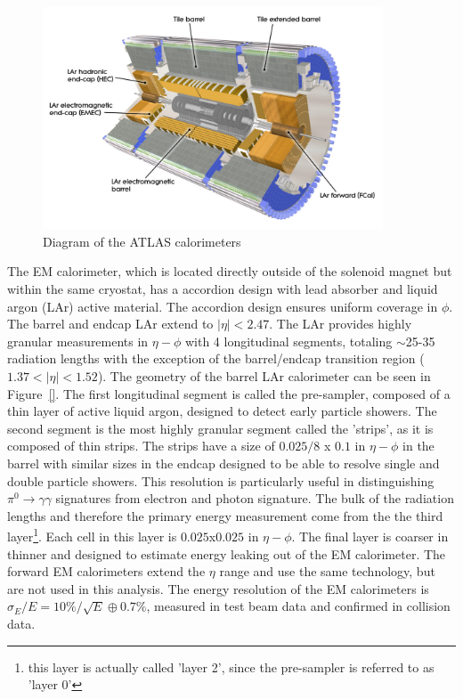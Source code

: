 \begin{figure}[!t]
\centering 
\includegraphics[width=0.9\textwidth]{figs/lhc/Calorimeter-eps-converted-to}
\caption{Diagram of the ATLAS calorimeters}
\label{figure:lhc_calo}
\end{figure}


The EM calorimeter, which is located directly outside of the solenoid magnet but within the same cryostat, has a accordion design with lead absorber and liquid argon (LAr) active material. The accordion design ensures uniform coverage in $\phi$. The barrel and endcap LAr extend to $|\eta| < 2.47$. The LAr provides highly granular measurements in $\eta-\phi$ with 4 longitudinal segments, totaling $\sim$25-35 radiation lengths with the exception of the barrel/endcap transition region ($1.37<|\eta|<1.52$).  The geometry of the barrel LAr calorimeter can be seen in Figure~\ref{}. The first longitudinal segment is called the pre-sampler, composed of a thin layer of active liquid argon, designed to detect early particle showers. The second segment is the most highly granular segment called the 'strips', as it is composed of thin strips. The strips have a size of $0.025/8$ x $0.1$ in $\eta-\phi$ in the barrel with similar sizes in the endcap designed to be able to resolve single and double particle showers. This resolution is particularly useful in distinguishing $\pi^0\rightarrow\gamma\gamma$ signatures from electron and photon signature. The bulk of the radiation lengths and therefore the primary energy measurement come from the the third layer\footnote{this layer is actually called 'layer 2', since the pre-sampler is referred to as 'layer 0'}. Each cell in this layer is $0.025$x$0.025$ in $\eta-\phi$. The final layer is coarser in thinner and designed to estimate energy leaking out of the EM calorimeter. The forward EM calorimeters extend the $\eta$ range and use the same technology, but are not used in this analysis. The energy resolution of the EM calorimeters is $\sigma_E/E = 10\%/\sqrt{E}\oplus0.7\%$, measured in test beam data and confirmed in collision data. 

